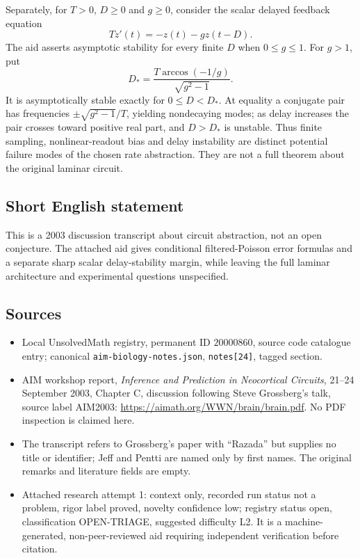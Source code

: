 \documentclass[11pt]{article}
\begin{document}
Separately, for $T>0$, $D\ge0$ and $g\ge0$, consider the scalar delayed feedback equation
\[
Tz'(t)=-z(t)-gz(t-D).
\]
The aid asserts asymptotic stability for every finite $D$ when $0\le g\le1$. For $g>1$, put
\[
D_*=\frac{T\arccos(-1/g)}{\sqrt{g^2-1}}.
\]
It is asymptotically stable exactly for $0\le D<D_*$. At equality a conjugate pair has frequencies $\pm\sqrt{g^2-1}/T$, yielding nondecaying modes; as delay increases the pair crosses toward positive real part, and $D>D_*$ is unstable. Thus finite sampling, nonlinear-readout bias and delay instability are distinct potential failure modes of the chosen rate abstraction. They are not a full theorem about the original laminar circuit.
\subsection{Short English statement}
This is a 2003 discussion transcript about circuit abstraction, not an open conjecture. The attached aid gives conditional filtered-Poisson error formulas and a separate sharp scalar delay-stability margin, while leaving the full laminar architecture and experimental questions unspecified.
\subsection{Sources}
\begin{itemize}
\item Local UnsolvedMath registry, permanent ID $20000860$, source code catalogue entry; canonical \texttt{aim-biology-notes.json}, \texttt{notes[24]}, tagged section.
\item AIM workshop report, \emph{Inference and Prediction in Neocortical Circuits}, 21--24 September 2003, Chapter C, discussion following Steve Grossberg's talk, source label AIM2003: \url{https://aimath.org/WWN/brain/brain.pdf}. No PDF inspection is claimed here.
\item The transcript refers to Grossberg's paper with ``Razada'' but supplies no title or identifier; Jeff and Pentti are named only by first names. The original remarks and literature fields are empty.
\item Attached research attempt 1: context only, recorded run status not a problem, rigor label proved, novelty confidence low; registry status open, classification OPEN-TRIAGE, suggested difficulty L2. It is a machine-generated, non-peer-reviewed aid requiring independent verification before citation.
\end{itemize}
\end{document}
